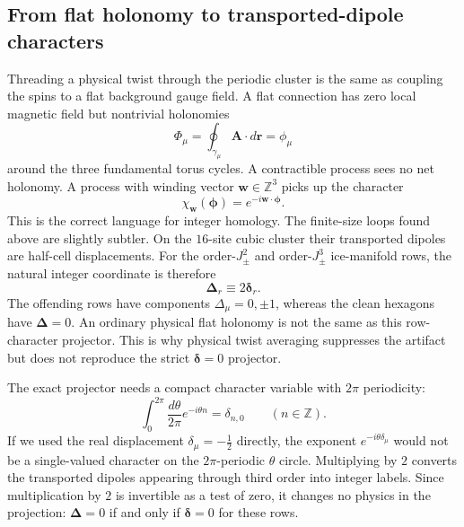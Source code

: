 \documentclass[11pt,letterpaper]{article}
\newcommand{\Jpm}{J_{\pm}}
\newcommand{\bA}{\bm A}
\newcommand{\br}{\bm r}
\newcommand{\bw}{\bm w}
\newcommand{\bdelta}{\bm \delta}
\newcommand{\bDelta}{\bm \Delta}
\newcommand{\bphi}{\bm \phi}
\newcommand{\Z}{\mathbb Z}
\theoremstyle{plain}
\theoremstyle{definition}
\begin{document}
\subsection{From flat holonomy to transported-dipole characters}

Threading a physical twist through the periodic cluster is the same as
coupling the spins to a flat background gauge field.  A flat connection has
zero local magnetic field but nontrivial holonomies
\begin{equation}
\Phi_\mu=\oint_{\gamma_\mu} \bA\cdot d\br=\phi_\mu
\end{equation}
around the three fundamental torus cycles.  A contractible process sees no
net holonomy.  A process with winding vector $\bw\in\Z^3$ picks up the
character
\begin{equation}
\chi_{\bw}(\bphi)=e^{-i\bw\cdot\bphi}.
\label{eq:holonomy_character}
\end{equation}
This is the correct language for integer homology.  The finite-size loops
found above are slightly subtler.  On the $16$-site cubic cluster their
transported dipoles are half-cell displacements.  For the order-$\Jpm^2$ and
order-$\Jpm^3$ ice-manifold rows, the natural integer coordinate is therefore
\begin{equation}
\bDelta_r\equiv2\bdelta_r .
\label{eq:delta2_def}
\end{equation}
The offending rows have components $\Delta_\mu=0,\pm1$, whereas the clean
hexagons have $\bDelta=0$.  An ordinary physical flat holonomy is not the same
as this row-character projector.  This is why physical twist averaging
suppresses the artifact but does not reproduce the strict $\bdelta=0$
projector.

The exact projector needs a compact character variable with $2\pi$ periodicity:
\[
\int_0^{2\pi}\frac{d\theta}{2\pi}e^{-i\theta n}=\delta_{n,0}
\qquad (n\in\Z).
\]
If we used the real displacement $\delta_\mu=-\tfrac12$ directly, the exponent
$e^{-i\theta\delta_\mu}$ would not be a single-valued character on the
$2\pi$-periodic $\theta$ circle.  Multiplying by $2$ converts the transported
dipoles appearing through third order into integer labels.  Since
multiplication by $2$ is invertible as a test of zero, it changes no physics in
the projection: $\bDelta=0$ if and only if $\bdelta=0$ for these rows.
\end{document}
